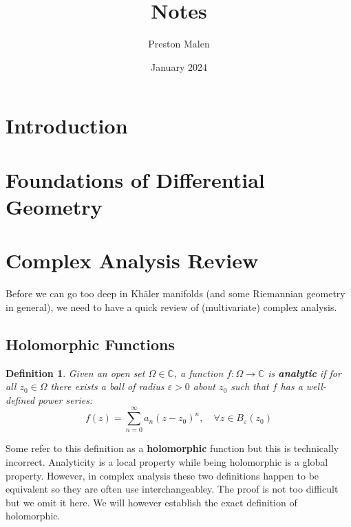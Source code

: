 \documentclass[12pt, letterpaper]{article}
\title{Notes}
\author{Preston Malen}
\date{January 2024}
\newtheorem{definition}{Definition}[section]
\newcommand{\C}{\mathbb{C}}
\newcommand{\ten}[1]{\textnormal{\textbf{#1}}}
\begin{document}
\maketitle
\thispagestyle{empty}


\newpage
\thispagestyle{empty}
\tableofcontents


\newpage
\clearpage

\section*{Introduction}

\newpage

\section{Foundations of Differential Geometry}


\section{Complex Analysis Review}
Before we can go too deep in Khäler manifolds (and some Riemannian geometry in
general), we need to have a quick review of (multivariate) complex analysis.

\subsection{Holomorphic Functions}

\begin{definition}\label{def 3.1}
    Given an open set $\Omega \in \C$, a function $f: \Omega \to \C$ is \ten{analytic}
    if for all $z_0 \in \Omega$ there exists a ball of radius $\varepsilon>0$ about
    $z_0$ such that $f$ has a well-defined power series:
    \begin{equation*}
        f(z) = \sum_{n=0}^\infty a_n (z-z_0)^n, \quad \forall z \in B_\varepsilon
        (z_0)
    \end{equation*}
\end{definition}

Some refer to this definition as a \textbf{holomorphic} function but this is technically
incorrect. Analyticity is a local property while being holomorphic is a global property.
However, in complex analysis these two definitions happen to be equivalent so they 
are often use interchangeabley. The proof is not too difficult but we omit it here.
We will however establish the exact definition of holomorphic.
\end{document}

